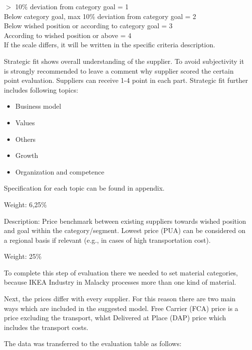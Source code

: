 \documentclass[oneside,12pt]{article}%
\begin{document}
\vspace{10mm}

\noindent $>$ 10\% deviation from category goal = 1 \\
Below category goal, max 10\% deviation from category goal = 2 \\
Below wished position or according to category goal = 3 \\
According to wished position or above = 4 \\


If the scale differs, it will be written in the specific criteria description.

Strategic fit shows overall understanding of the supplier. To avoid subjectivity it is strongly recommended to leave a comment why supplier scored the certain point evaluation. Suppliers can receive 1-4 point in each part. Strategic fit further includes following topics:
\begin{itemize}
  \item Business model
  \item Values
  \item Others
  \item Growth
  \item Organization and competence
\end{itemize}

Specification for each topic can be found in appendix. \par
\vspace{2mm}
\noindent Weight: 6,25\%



Description: Price benchmark between existing suppliers towards wished position and goal within the category/segment. Lowest price (PUA) can be considered on a regional basis if relevant (e.g., in cases of high transportation cost).

\vspace{2mm}
\noindent Weight: 25\%
\vspace{2mm}

To complete this step of evaluation there we needed to set material categories, because IKEA Industry in Malacky processes more than one kind of material. \par
Next, the prices differ with every supplier. For this reason there are two main ways which are included in the suggested model. Free Carrier (FCA) price is a price excluding the transport, whlst Delivered at Place (DAP) price which includes the transport costs. \par
The data was transferred to the evaluation table as follows:
\end{document}
